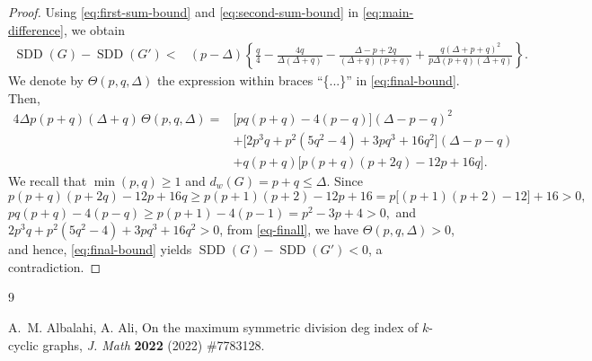 \documentclass[10pt]{article}
\newcommand{\SDD}{\operatorname{SDD}}
\begin{document}
\begin{proof}
Using \eqref{eq:first-sum-bound} and \eqref{eq:second-sum-bound} in
\eqref{eq:main-difference}, we obtain \begin{align}
\SDD(G)-\SDD(G')
<{}&(p-\Delta)\left\{
\frac q4-\frac{4q}{\Delta(\Delta+q)}
-\frac{\Delta-p+2q}{(\Delta+q)(p+q)}
+\frac{q(\Delta+p+q)^2}{p\Delta (p+q)(\Delta+q)}
\right\}.
\label{eq:final-bound}
\end{align}
We denote by  $\Theta(p,q,\Delta)$ the expression within braces ``\{...\}'' in
\eqref{eq:final-bound}.
Then,
\begin{align}\label{eq-finall}
4\Delta p(p+q)(\Delta+q)\,\Theta(p,q,\Delta)
={}&\bigl[pq(p+q)-4(p-q)\bigr](\Delta-p-q)^2\nonumber\\
&+\bigl[2p^3q+p^2(5q^2-4)+3pq^3+16q^2\bigr]
(\Delta-p-q)\nonumber\\
&+q(p+q)\bigl[p(p+q)(p+2q)-12p+16q\bigr].
\end{align}
We recall that $\min(p,q)\ge1$ and $d_w(G)=p+q\le\Delta$. Since
\[
p(p+q)(p+2q)-12p+16q
\ge p(p+1)(p+2)-12p+16=p\bigl[(p+1)(p+2)-12\bigr]+16>0,
\]
$pq(p+q)-4(p-q)
\ge p(p+1)-4(p-1)
=p^2-3p+4>0,$ and $2p^3q+p^2(5q^2-4)+3pq^3+16q^2>0$,
from \eqref{eq-finall}, we have $\Theta(p,q,\Delta)>0$, and hence, \eqref{eq:final-bound} yields $\SDD(G)-\SDD(G')<0$, a contradiction.
\end{proof}







\begin{thebibliography}{9}

A.~M. Albalahi, A. Ali,
On the maximum symmetric division deg index of $k$-cyclic graphs,
\emph{J. Math} \textbf{2022} (2022)  \#7783128.

\end{thebibliography}
\end{document}
